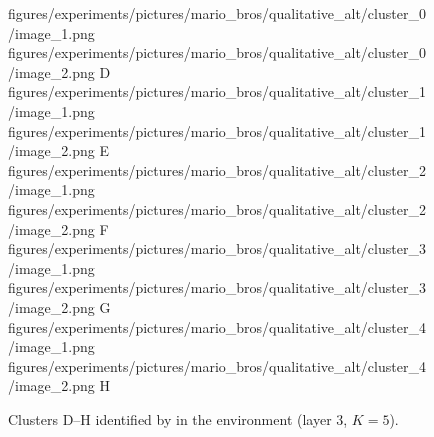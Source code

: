 \begin{figure}[H]
    \qualitativeClusterFigureSetup
    \qualitativeClusterTwo
        {figures/experiments/pictures/mario_bros/qualitative_alt/cluster_0/image_1.png}
        {figures/experiments/pictures/mario_bros/qualitative_alt/cluster_0/image_2.png}
        {D}
    \qualitativeClusterTwo
        {figures/experiments/pictures/mario_bros/qualitative_alt/cluster_1/image_1.png}
        {figures/experiments/pictures/mario_bros/qualitative_alt/cluster_1/image_2.png}
        {E}
    \qualitativeClusterTwo
        {figures/experiments/pictures/mario_bros/qualitative_alt/cluster_2/image_1.png}
        {figures/experiments/pictures/mario_bros/qualitative_alt/cluster_2/image_2.png}
        {F}
    \qualitativeClusterTwo
        {figures/experiments/pictures/mario_bros/qualitative_alt/cluster_3/image_1.png}
        {figures/experiments/pictures/mario_bros/qualitative_alt/cluster_3/image_2.png}
        {G}
    \qualitativeClusterTwo
        {figures/experiments/pictures/mario_bros/qualitative_alt/cluster_4/image_1.png}
        {figures/experiments/pictures/mario_bros/qualitative_alt/cluster_4/image_2.png}
        {H}
    \caption{Clusters D--H identified by  in the \MarioBrosName environment (layer 3, $K=5$).}
    \label{fig:qualitative_mario_bros_alt}
\end{figure}
